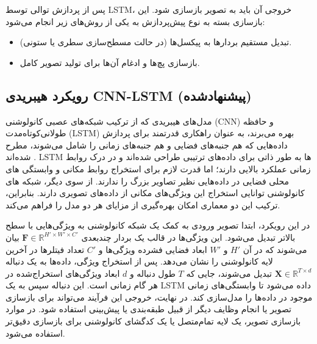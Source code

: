 پس از پردازش توالی توسط LSTM، خروجی آن باید به تصویر بازسازی شود. این بازسازی بسته به نوع پیش‌پردازش به یکی از روش‌های زیر انجام می‌شود:
\begin{itemize}
	\item تبدیل مستقیم بردارها به پیکسل‌ها (در حالت مسطح‌سازی سطری یا ستونی).
	\item بازسازی پچ‌ها و ادغام آن‌ها برای تولید تصویر کامل.
\end{itemize}

\subsection{رویکرد هیبریدی CNN-LSTM (پیشنهادشده)}
مدل‌های هیبریدی که از ترکیب شبکه‌های عصبی کانولوشنی (CNN) و حافظه طولانی‌کوتاه‌مدت (LSTM) بهره می‌برند، به عنوان راهکاری قدرتمند برای پردازش داده‌هایی که هم جنبه‌های فضایی و هم جنبه‌های زمانی را شامل می‌شوند، مطرح شده‌اند
\cite{shiConvolutionalLSTMNetwork2015}.
LSTM
 ها به طور ذاتی برای داده‌های ترتیبی طراحی شده‌اند و در درک روابط زمانی عملکرد بالایی دارند؛ اما قدرت لازم برای استخراج روابط مکانی و وابستگی های محلی فضایی در داده‌هایی نظیر تصاویر بزرگ را ندارند. از سوی دیگر، شبکه های کانولوشنی توانایی استخراج این ویژگی‌های مکانی از داده‌های تصویری دارند. بنابراین، ترکیب این دو معماری امکان بهره‌گیری از مزایای هر دو مدل را فراهم می‌کند.

در این رویکرد، ابتدا تصویر ورودی به کمک یک شبکه کانولوشنی به ویژگی‌هایی با سطح بالاتر تبدیل می‌شود. این ویژگی‌ها در قالب یک بردار چندبعدی $\mathbf{F} \in \mathbb{R}^{H' \times W' \times C'}$ بیان می‌شوند که در آن $H'$ و $W'$ ابعاد فضایی فشرده ویژگی‌ها و $C'$ تعداد فیتلر‌ها در آخرین لایه کانولوشنی را نشان می‌دهد. پس از استخراج ویژگی، داده‌ها به یک دنباله $\mathbf{X} \in \mathbb{R}^{T \times d}$ تبدیل می‌شوند، جایی که $T$ طول دنباله و $d$ ابعاد ویژگی‌های استخراج‌شده در هر گام زمانی است. این دنباله سپس به یک LSTM داده می‌شود تا وابستگی‌های زمانی موجود در داده‌ها را مدل‌سازی کند. در نهایت، خروجی این فرآیند می‌تواند برای بازسازی تصویر یا انجام وظایف دیگر از قبیل طبقه‌بندی یا پیش‌بینی استفاده شود. در موارد بازسازی تصویر، یک لایه تمام‌متصل یا یک کدگشای کانولوشنی برای بازسازی دقیق‌تر استفاده می‌شود.


